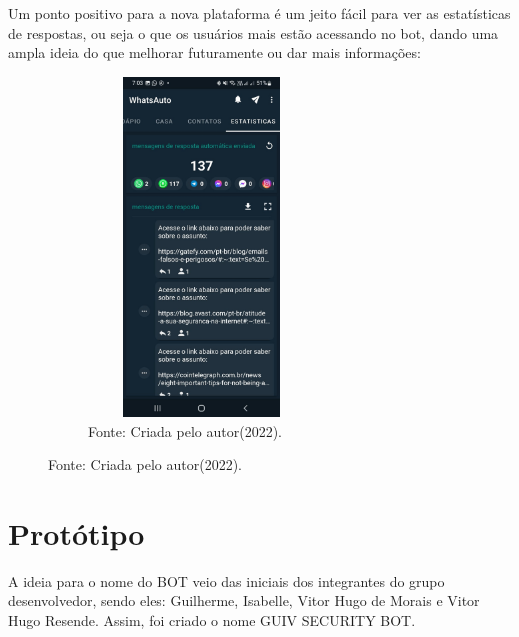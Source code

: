  Um ponto positivo para a nova plataforma é um jeito fácil para ver as estatísticas de respostas, ou seja o que os usuários mais estão acessando no bot, dando uma ampla ideia do que melhorar futuramente ou dar mais informações:

\begin{figure}[!htb]
\centering
\captionsetup[subfigure]{labelformat=empty}
\caption{``Estatisticas de respostas''}
\begin{subfigure}{.5\textwidth}
\centering
\includegraphics[width=6cm,height=9cm]{Bot/Partes/Imagens/Estatisticas.jpeg}
\caption{Fonte: Criada pelo autor(2022).}
\end{subfigure}%
\end{figure}

        \newpage


\section{Protótipo}

A ideia para o nome do BOT veio das iniciais dos integrantes do grupo desenvolvedor, sendo eles: Guilherme, Isabelle, Vitor Hugo de Morais e Vitor Hugo Resende. Assim, foi criado o nome GUIV SECURITY BOT.

